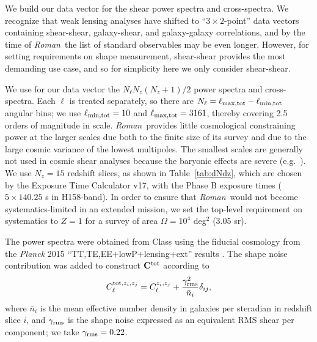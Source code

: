 \documentclass[usenatbib]{mnras}
\newcommand{\wfirst}{{\slshape Roman}}
\begin{document}
We build our data vector for the shear power spectra and cross-spectra. We recognize that weak lensing analyses have shifted to ``$3\times 2$-point'' data vectors containing shear-shear, galaxy-shear, and galaxy-galaxy correlations, and by the time of \wfirst\ the list of standard observables may be even longer. However, for setting requirements on shape measurement, shear-shear provides the most demanding use case, and so for simplicity here we only consider shear-shear.

We use for our data vector the $N_\ell N_z(N_z+1)/2$ power spectra and
cross-spectra. Each $\ell$ is treated separately, so there are
$N_\ell=\ell_{\rm max,tot}-\ell_{\rm min,tot}$ angular bins; we use
$\ell_{\rm min,tot}=10$ and $\ell_{\rm max,tot}=3161$, thereby
covering 2.5 orders of magnitude in scale. \wfirst\ provides little
cosmological constraining power at the larger scales due both to the
finite size of its survey and due to the large cosmic variance of the
lowest multipoles. The smallest scales are generally not used in
cosmic shear analyses because the baryonic effects are severe (e.g.\
\cite{2008PhRvD..77d3507Z, 2013PhRvD..87d3509Z}). We use $N_z=15$
redshift slices, as shown in Table~\ref{tab:dNdz}, which are chosen by the Exposure Time Calculator \citep{2012arXiv1204.5151H} v17, with the Phase B exposure times ($5\times 140.25$ s in H158-band). In order to ensure
that \wfirst\ would not become systematics-limited in an extended
mission, we set the top-level requirement on systematics to $Z=1$ for
a survey of area $\Omega =10^4$ deg$^2$ (3.05 sr).

The power spectra were obtained from {\sc Class}
\citep{2011JCAP...07..034B} using the fiducial cosmology from the
{\slshape Planck} 2015 ``TT,TE,EE+lowP+lensing+ext'' results
\citep{2016A&A...594A..13P}. The shape noise contribution was added to
construct ${\bf C}^{\rm tot}$ according to
\begin{equation}
C^{{\rm tot},z_i,z_j}_\ell = C^{z_i,z_j}_\ell + \frac{\gamma_{\rm rms}^2}{\bar n_i}\delta_{ij},
\end{equation}
where $\bar n_i$ is the mean effective number density in galaxies per
steradian in redshift slice $i$, and $\gamma_{\rm rms}$ is the shape
noise expressed as an equivalent RMS shear per component; we take
$\gamma_{\rm rms} = 0.22$.
\end{document}
